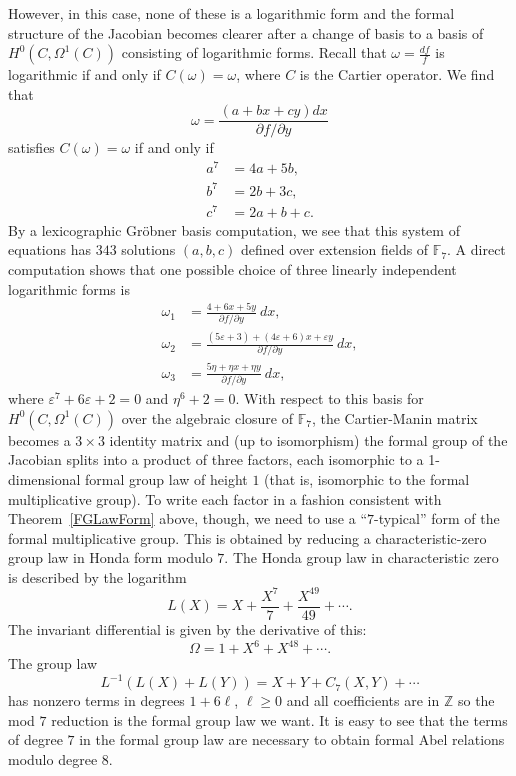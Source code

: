 \documentclass[12pt]{amsart}
\theoremstyle{theorem}
\newcommand{\FF}{\mathbb{F}}
\newcommand{\ZZ}{\mathbb{Z}}
\begin{document}
However, in this case, none of these is a logarithmic form and the formal structure of the Jacobian becomes clearer after
a change of basis to a basis of $H^0(C, \Omega^1(C))$ consisting of logarithmic forms.  
Recall that $\omega = \frac{df}{f}$ is logarithmic if and only if $C(\omega) = \omega$, where 
$C$ is the Cartier operator.  We find that 
$$\omega = \frac{(a + bx + cy) dx }{\partial f/\partial y}$$
satisfies $C(\omega) = \omega$ if and only if 
\begin{align*}
a^7 &= 4 a + 5 b,\\
b^7 &= 2 b + 3c,\\
c^7 &= 2 a + b + c.
\end{align*}
By a lexicographic Gr\"obner basis computation, we see that this system of equations has $343$ solutions
$(a,b,c)$ defined over extension fields of $\FF_7$.  A direct computation shows that one possible choice of three linearly independent
logarithmic forms is
\begin{align*}
\omega_1 &= \frac{4 + 6x + 5y}{\partial f/\partial y}\ dx,\\
\omega_2 &= \frac{(5 \varepsilon + 3) + (4 \varepsilon + 6) x + \varepsilon y}{\partial f/\partial y}\ dx,\\
\omega_3 &= \frac{5 \eta + \eta x + \eta y}{\partial f/\partial y}\ dx,
\end{align*}
where $\varepsilon^7 + 6\varepsilon + 2 = 0$ and $\eta^6 + 2 = 0$.
With respect to this basis for $H^0(C,\Omega^1(C))$ over the algebraic closure of $\FF_7$, 
the Cartier-Manin matrix becomes a $3 \times 3$ identity matrix and (up to isomorphism) the formal group of 
the Jacobian splits into a product of three factors, each isomorphic to a 1-dimensional formal group 
law of height $1$ (that is, isomorphic to the formal multiplicative group).  To write each factor in a fashion consistent
with Theorem~\ref{FGLawForm} above, though, we need to use a ``$7$-typical'' form of the formal multiplicative 
group.  This is obtained by reducing a characteristic-zero group law in Honda form modulo $7$.  The Honda
group law in characteristic zero is described by the logarithm
$$L(X) = X + \frac{X^7}{7} + \frac{X^{49}}{49} + \cdots. $$
The invariant differential is given by the derivative of this:
$$\Omega = 1 + X^6 + X^{48} + \cdots .$$
The group law
$$L^{-1}(L(X) + L(Y)) = X + Y + C_7(X,Y) + \cdots $$
has nonzero terms in degrees $1 + 6\ell$, $\ell \ge 0$ and all coefficients are in $\ZZ$ so the mod $7$ reduction
is the formal group law we want.  It is easy to see that the terms of degree $7$ in the formal group law are necessary
to obtain formal Abel relations modulo degree 8.
\end{document}
